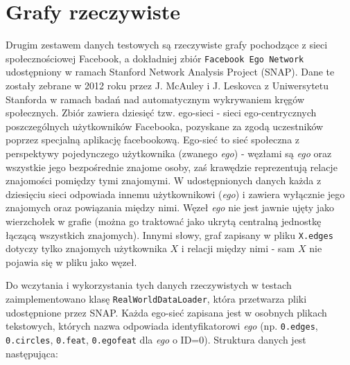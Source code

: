 \section{Grafy rzeczywiste}
Drugim zestawem danych testowych są rzeczywiste grafy pochodzące z sieci społecznościowej Facebook, a dokładniej zbiór \texttt{Facebook Ego Network} udostępniony w ramach Stanford Network Analysis Project (SNAP). Dane te zostały zebrane w 2012 roku przez J. McAuley i J. Leskovca z Uniwersytetu Stanforda w ramach badań nad automatycznym wykrywaniem kręgów społecznych. Zbiór zawiera dziesięć tzw. ego-sieci - sieci ego-centrycznych poszczególnych użytkowników Facebooka, pozyskane za zgodą uczestników poprzez specjalną aplikację facebookową. Ego-sieć to sieć społeczna z perspektywy pojedynczego użytkownika (zwanego \textit{ego}) - węzłami są \textit{ego} oraz wszystkie jego bezpośrednie znajome osoby, zaś krawędzie reprezentują relacje znajomości pomiędzy tymi znajomymi. W udostępnionych danych każda z dziesięciu sieci odpowiada innemu użytkownikowi (\textit{ego}) i zawiera wyłącznie jego znajomych oraz powiązania między nimi. Węzeł \textit{ego} nie jest jawnie ujęty jako wierzchołek w grafie (można go traktować jako ukrytą centralną jednostkę łączącą wszystkich znajomych). Innymi słowy, graf zapisany w pliku \verb|X.edges| dotyczy tylko znajomych użytkownika $X$ i relacji między nimi - sam $X$ nie pojawia się w pliku jako węzeł.

Do wczytania i wykorzystania tych danych rzeczywistych w testach zaimplementowano klasę \verb|RealWorldDataLoader|, która przetwarza pliki udostępnione przez SNAP. Każda ego-sieć zapisana jest w osobnych plikach tekstowych, których nazwa odpowiada identyfikatorowi \textit{ego} (np. \verb|0.edges|, \verb|0.circles|, \verb|0.feat|, \verb|0.egofeat| dla \textit{ego} o ID=0). Struktura danych jest następująca:

